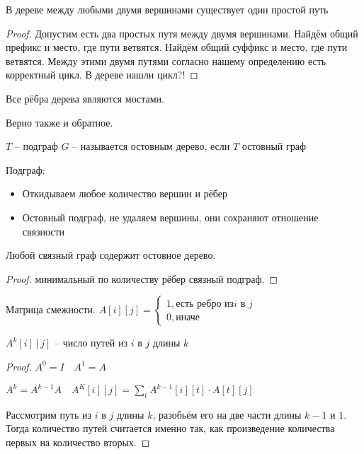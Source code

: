 \documentclass{book}
\theoremstyle{definition}
\begin{document}
    \begin{theorem}
        В дереве между любыми двумя вершинами существует один простой путь
    \end{theorem}
    \begin{proof}
        Допустим есть два простых путя между двумя вершинами. Найдём общий префикс и место, где пути ветвятся. Найдём общий суффикс и место, где пути ветвятся. Между этими двумя путями согласно нашему определению есть корректный цикл. В дереве нашли цикл?!
    \end{proof}

    \begin{statement}
        Все рёбра дерева являются мостами.

        Верно также и обратное.
    \end{statement}

    \begin{definition}
        $T$ -- подграф  $G$ -- называется остовным дерево, если  $T$ остовный граф
    \end{definition}

    \begin{definition}
        Подграф:
        \begin{itemize}
            \item Откидываем любое количество вершин и рёбер
            \item Остовный подграф, не удаляем вершины, они сохраняют отношение связности
        \end{itemize}
    \end{definition}

    \begin{statement}
        Любой связный граф содержит остовное дерево.
    \end{statement}
    \begin{proof}
        минимальный по количеству рёбер связный подграф.
    \end{proof}

    \begin{definition}
        Матрица смежности. $A[i][j] = \begin{cases}
            1, \text{есть ребро из} i \text{ в } j\\
            0, \text{иначе}
        \end{cases}$
    \end{definition}

    \begin{theorem}
        $A^k[i][j]$ -- число путей из  $i$ в  $j$ длины  $k$
    \end{theorem}
    \begin{proof}
        $A^0 = I\quad A^1 = A$

        $A^k = A^{k-1}A \quad A^K[i][j] = \sum_t A^{k-1}[i][t] \cdot  A[t][j]$

        Рассмотрим путь из $i$ в  $j$ длины  $k$, разобьём его на две части длины  $k-1$ и  $1$. Тогда количество путей считается именно так, как произведение количества первых на количество вторых.
    \end{proof}
\end{document}

